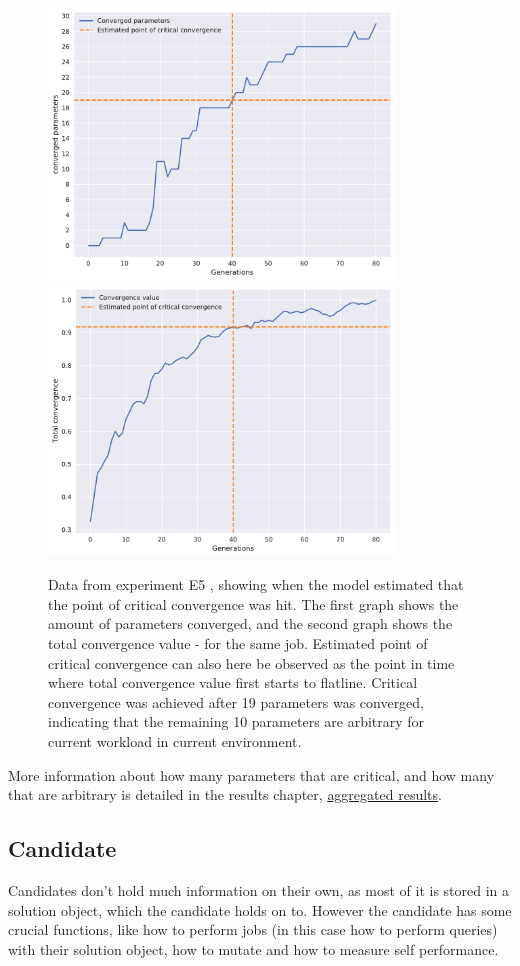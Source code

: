 \documentclass[a4paper,english]{report}
\begin{document}
		\begin{figure}[H]
			\centering
			\includegraphics[width=260pt]{est21}
			\includegraphics[width=260pt]{est22}
			\caption{Data from experiment E5 , showing when the model estimated that the point of critical convergence was hit. The first graph shows the amount of parameters converged, and the second graph shows the total convergence value - for the same job. Estimated point of critical convergence can also here be observed as the point in time where total convergence value first starts to flatline. Critical convergence was achieved after 19 parameters was converged, indicating that the remaining 10 parameters are arbitrary for current workload in current environment.}
			\label{fig:estimation2}
		\end{figure}
		More information about how many parameters that are critical, and how many that are arbitrary is detailed in the results chapter, \hyperref[sec:aggres]{aggregated results}.
		\clearpage
		\subsection{Candidate}
		Candidates don't hold much information on their own, as most of it is stored in a solution object, which the candidate holds on to. However the candidate has some crucial functions, like how to perform jobs (in this case how to perform queries) with their solution object, how to mutate and how to measure self performance.
\end{document}
